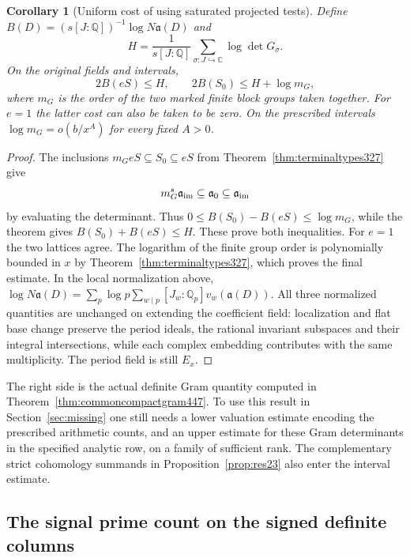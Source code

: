 \documentclass[a4paper,11pt]{article}
\newtheorem{corollary}[proposition]{Corollary}
\theoremstyle{definition}
\theoremstyle{remark}
\numberwithin{equation}{section}
\begin{document}
\begin{corollary}[Uniform cost of using saturated projected tests]\leavevmode
\label{cor:saturatedcontent448}
Define \(B(D)=(s[J:\mathbb Q])^{-1}\log N\mathfrak a(D)\) and
\[
       H=\frac{1}{s[J:\mathbb Q]}
             \sum_{\sigma:J\hookrightarrow\mathbb C}\log\det G_\sigma .
\]
On the original fields and intervals,
\[
      2B(eS)\le H,\qquad
      2B(S_0)\le H+\log m_G ,
\]
where \(m_G\) is the order of the two marked finite block groups
taken together. For \(e=1\) the latter cost can also be taken
to be zero. On the prescribed intervals \(\log m_G=o(b/x^A)\)
for every fixed \(A>0\).
\end{corollary}
\begin{proof}
The inclusions \(m_G eS\subseteq S_0\subseteq eS\) from
Theorem~\ref{thm:terminaltypes327} give
\[
       m_G^s\mathfrak a_{\rm im}\subseteq\mathfrak a_0
                     \subseteq\mathfrak a_{\rm im}
\]
by evaluating the determinant. Thus
\(0\le B(S_0)-B(eS)\le\log m_G\), while the theorem gives
\(B(S_0)+B(eS)\le H\). These prove both inequalities.
For \(e=1\) the two lattices agree. The logarithm of the finite
group order is polynomially bounded in \(x\) by
Theorem~\ref{thm:terminaltypes327}, which proves the final
estimate. In the local normalization above,
\(\log N\mathfrak a(D)=\sum_p\log p\sum_{w\mid p}
[J_w:\mathbb Q_p]v_w(\mathfrak a(D))\).
All three normalized quantities are unchanged on extending
the coefficient field: localization and flat base change preserve
the period ideals, the rational invariant subspaces and their
integral intersections, while each complex embedding contributes
with the same multiplicity. The period field is still \(E_x\).
\end{proof}

The right side is the actual definite Gram quantity computed in
Theorem~\ref{thm:commoncompactgram447}. To use this result in
Section~\ref{sec:missing} one still needs a lower valuation
estimate encoding the prescribed arithmetic counts, and an
upper estimate for these Gram determinants in the specified
analytic row, on a family of sufficient rank. The complementary
strict cohomology summands in Proposition~\ref{prop:res23}
also enter the interval estimate.


\subsection{The signal prime count on the signed definite columns}
\label{sec:signedsignal450}
\end{document}
